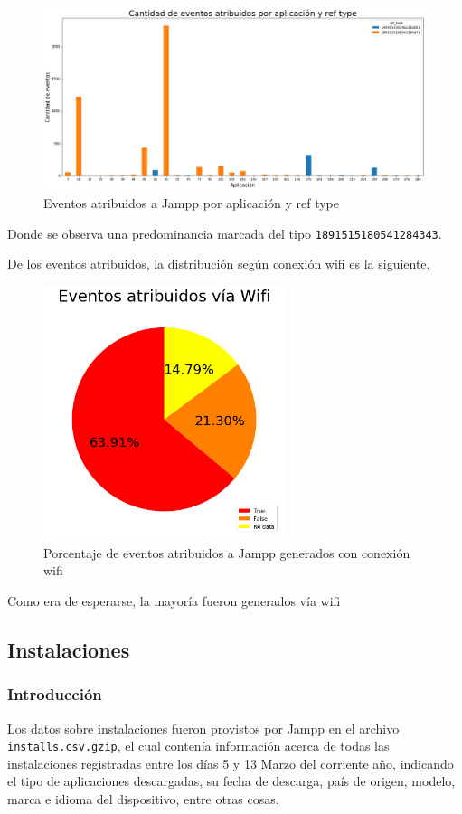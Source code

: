 \documentclass[a4paper, 12pt]{article}
\begin{document}
		\FloatBarrier
		\begin{figure}[h]
			\centering
			\includegraphics[width=\textwidth]{images/events/atrreftype.png}
			\caption{Eventos atribuidos a Jampp por aplicación y ref type}
		\end{figure}
		\FloatBarrier
		
		Donde se observa una predominancia marcada del tipo \texttt{1891515180541284343}.
		
		De los eventos atribuidos, la distribución según conexión wifi es la siguiente.
		
		\FloatBarrier
		\begin{figure}[h]
			\centering
			\includegraphics[width=200pt]{images/events/wifiattributed.png}
			\caption{Porcentaje de eventos atribuidos a Jampp generados con conexión wifi}
		\end{figure}
		\FloatBarrier
		
		Como era de esperarse, la mayoría fueron generados vía wifi

\clearpage
\subsection{Instalaciones}
	\subsubsection{Introducción}
		Los datos sobre instalaciones fueron provistos por Jampp en el archivo \texttt{installs.csv.gzip}, el cual contenía
		información acerca de todas las instalaciones registradas entre los días 5 y 13  Marzo del corriente año,
		indicando el tipo de aplicaciones descargadas, su fecha de descarga, país de origen, modelo, marca e idioma del dispositivo, entre otras cosas.
\end{document}

